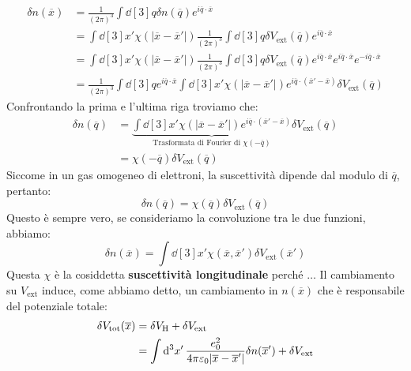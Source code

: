 \begin{equation*}
    \begin{aligned}
        \delta n(\overline x) &=\frac{1}{(2\pi)^3}\int \dd[3]q\delta n(\overline q)e^{i\overline q \cdot \overline x} \\
        & = \int \dd[3]{x'}\chi(|\overline x - \overline{x}'|)\frac{1}{(2\pi)^3}\int \dd[3]{q}\delta V_{\text{ext}}(\overline q)e^{i\overline q \cdot \overline x} \\
        & = \int \dd[3]{x'}\chi(|\overline x - \overline{x}'|)\frac{1}{(2\pi)^3}\int \dd[3]{q}\delta V_{\text{ext}}(\overline q)e^{i\overline q \cdot \overline x}e^{i\overline q \cdot \overline x}e^{-i\overline q \cdot \overline x} \\
        & = \frac{1}{(2\pi)^3}\int \dd[3]{q}e^{i\overline q \cdot \overline x}\int\dd[3]{x'}\chi(|\overline x - \overline{x}'|)e^{i\overline q \cdot (\overline{x}'-\overline{x})}\delta V_{\text{ext}}(\overline q)
    \end{aligned}
\end{equation*}
Confrontando la prima e l'ultima riga troviamo che:
\begin{equation*}
    \begin{aligned}
        \delta n(\overline q) &=\underbrace{\int \dd[3]{x'}\chi(|\overline x - \overline{x}'|)e^{i\overline q \cdot (\overline{x}' - \overline x)}}_{\text{Trasformata di Fourier di } \chi(-\overline{q})}\delta V_{\text{ext}}(\overline q) \\
        & = \chi(-\overline{q})\delta V_{\text{ext}}(\overline q)
    \end{aligned}
\end{equation*}
Siccome in un gas omogeneo di elettroni, la suscettività dipende dal modulo di $\overline q$, pertanto:
\begin{equation*}
    \delta n(\overline q) = \chi(\overline q)\delta V_{\text{ext}}(\overline q)
\end{equation*}
Questo è sempre vero, se consideriamo la convoluzione tra le due funzioni, abbiamo:
\begin{equation*}
    \delta n(\overline x)=\int \dd[3]{x'}\chi(\overline x, \overline{x}')\delta V_{\text{ext}}(\overline{x}')
\end{equation*}
Questa $\chi$ è la cosiddetta \textbf{suscettività longitudinale} perché $\dots$
Il cambiamento su $V_{\text{ext}}$ induce, come abbiamo detto, un cambiamento in $n(\overline x)$ che è responsabile del potenziale totale:
\begin{equation*}
    \begin{aligned}
        \delta V_{\text{tot}}(\overline x) &=\delta V_{\text H}+ \delta V_{\text{ext}} \\
        & = \int \dd[3]{x'}\frac{e_0^2}{4\pi\varepsilon_0|\overline{x} - \overline{x}'|}\delta n(\overline{x}') + \delta V_{\text{ext}}
    \end{aligned}
\end{equation*}
